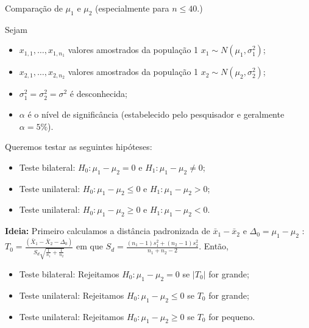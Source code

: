 \documentclass[9pt]{beamer}
\begin{document}
\begin{frame}{Comparação de $\mu_1$ e $\mu_2$ (especialmente para $n \leq 40$.)}

\small

Sejam
\begin{itemize}
	\item $x_{1,1}, \dots, x_{1, n_1}$ valores amostrados da população 1 $x_1 \sim N(\mu_1, \sigma_1^2)$;
	\item $x_{2,1}, \dots, x_{2, n_2}$ valores amostrados da população 1 $x_2 \sim N(\mu_2, \sigma_2^2)$;
	\item $\sigma_1^2=\sigma_2^2=\sigma^2$ é desconhecida;
	\item $\alpha$ é o nível de significância (estabelecido pelo pesquisador e geralmente $\alpha=5\%$). 
\end{itemize}
\vfill

Queremos testar as seguintes hipóteses:
\begin{itemize}
	\item Teste bilateral: $H_0: \mu_1 - \mu_2 = 0$ e $H_1: \mu_1 - \mu_2 \neq 0$;
	\item Teste unilateral: $H_0: \mu_1 - \mu_2 \leq 0$ e $H_1: \mu_1 - \mu_2 > 0$;
	\item Teste unilateral: $H_0: \mu_1 - \mu_2 \geq 0$ e $H_1: \mu_1 - \mu_2 < 0$.
\end{itemize}
\vfill

\textbf{Ideia:} Primeiro calculamos a distância padronizada de $\bar{x}_1 - \bar{x}_2$ e $\Delta_0=\mu_1 - \mu_2$ : $T_0 = \frac{(\bar{X}_1 - \bar{X}_2 - \Delta_0)}{S_d\sqrt{ \frac{1}{n_1} + \frac{1}{n_2} }}$ em que $S_d = \frac{(n_1-1) s_1^2 + (n_2-1) s_2^2}{n_1+n_2-2}$. Então, 
\begin{itemize}
	\item Teste bilateral: Rejeitamos $H_0: \mu_1 - \mu_2 =0$ se $\lvert T_0 \rvert$ for grande;
	\item Teste unilateral: Rejeitamos $H_0: \mu_1 - \mu_2 \leq 0$ se $T_0 $ for grande;
	\item Teste unilateral: Rejeitamos $H_0: \mu_1 - \mu_2 \geq 0$ se $T_0 $ for pequeno.
\end{itemize}

\normalsize
\end{frame}
\end{document}
